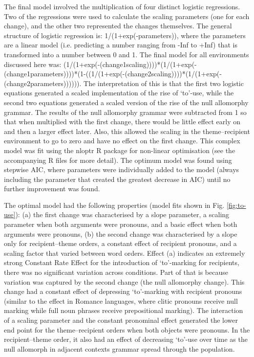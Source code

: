	The final model involved the multiplication of four distinct logistic regressions. Two of the regressions were used to calculate the scaling parameters (one for each change), and the other two represented the changes themselves. The general structure of logistic regression is: 1/(1+exp(-parameters)), where the parameters are a linear model (i.e. predicting a number ranging from -Inf to +Inf) that is transformed into a number between 0 and 1. The final model for all environments discussed here was: (1/(1+exp(-(change1scaling))))*(1/(1+exp(-(change1parameters))))*(1-((1/(1+exp(-(change2scaling))))*(1/(1+exp(-(change2parameters)))))). The interpretation of this is that the first two logistic equations generated a scaled implementation of the rise of `to'-use, while the second two equations generated a scaled version of the rise of the null allomorphy grammar. The results of the null allomorphy grammar were subtracted from 1 so that when multiplied with the first change, there would be little effect early on and then a larger effect later. Also, this allowed the scaling in the theme--recipient environment to go to zero and have no effect on the first change. This complex model was fit using the nloptr R package for non-linear optimisation (see the accompanying R files for more detail). The optimum model was found using stepwise AIC, where parameters were individually added to the model (always including the parameter that created the greatest decrease in AIC) until no further improvement was found.

	The optimal model had the following properties (model fits shown in Fig. \ref{fig:to-use}): (a) the first change was characterised by a slope parameter, a scaling parameter when both arguments were pronouns, and a basic effect when both arguments were pronouns, (b) the second change was characterised by a slope only for recipient--theme orders, a constant effect of recipient pronouns, and a scaling factor that varied between word orders. Effect (a) indicates an extremely strong Constant Rate Effect for the introduction of `to'-marking for recipients, there was no significant variation across conditions. Part of that is because variation was captured by the second change (the null allomorphy change). This change had a constant effect of depressing `to'-marking with recipient pronouns (similar to the effect in Romance languages, where clitic pronouns receive null marking while full noun phrases receive prepositional marking). The interaction of a scaling parameter and the constant pronominal effect generated the lower end point for the theme--recipient orders when both objects were pronouns. In the recipient--theme order, it also had an effect of decreasing `to'-use over time as the null allomorph in adjacent contexts grammar spread through the population.

